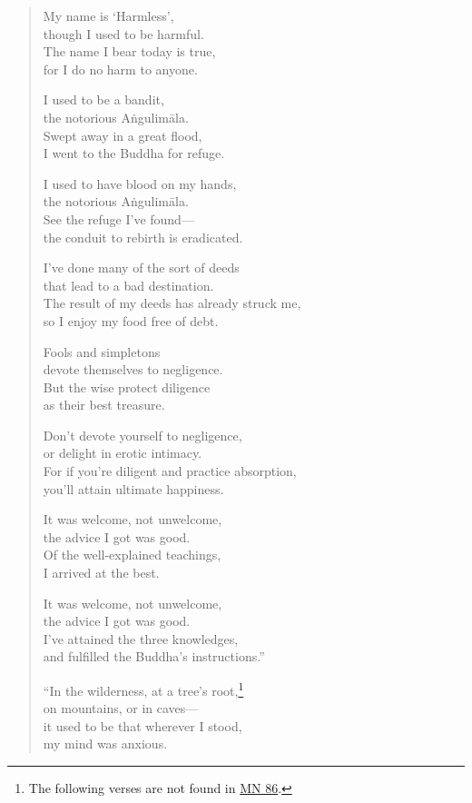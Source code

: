 \documentclass[12pt,openany]{book}%
\begin{document}
\begin{verse}
My name is ‘Harmless’, \\
though I used to be harmful. \\
The name I bear today is true, \\
for I do no harm to anyone. 

I used to be a bandit, \\
the notorious \textsanskrit{Aṅgulimāla}. \\
Swept away in a great flood, \\
I went to the Buddha for refuge. 

I used to have blood on my hands, \\
the notorious \textsanskrit{Aṅgulimāla}. \\
See the refuge I’ve found—\\
the conduit to rebirth is eradicated. 

I’ve done many of the sort of deeds \\
that lead to a bad destination. \\
The result of my deeds has already struck me, \\
so I enjoy my food free of debt. 

Fools and simpletons \\
devote themselves to negligence. \\
But the wise protect diligence \\
as their best treasure. 

Don’t devote yourself to negligence, \\
or delight in erotic intimacy. \\
For if you’re diligent and practice absorption, \\
you’ll attain ultimate happiness. 

It was welcome, not unwelcome, \\
the advice I got was good. \\
Of the well-explained teachings, \\
I arrived at the best. 

It was welcome, not unwelcome, \\
the advice I got was good. \\
I’ve attained the three knowledges, \\
and fulfilled the Buddha’s instructions.” 

“In the wilderness, at a tree’s root,\footnote{The following verses are not found in \href{https://suttacentral.net/mn86/en/sujato}{MN 86}. } \\
on mountains, or in caves—\\
it used to be that wherever I stood, \\
my mind was anxious. 


\end{verse}
\end{document}
